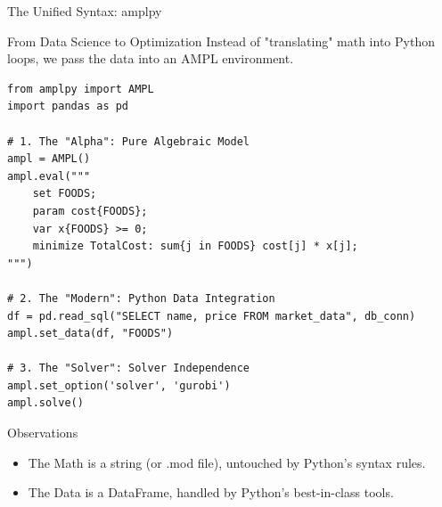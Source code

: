 \documentclass[presentation, aspectratio=169]{beamer}
\begin{document}
\begin{frame}[label={sec:org57c4a86},fragile]{The Unified Syntax: amplpy}
\begin{block}{From Data Science to Optimization}
Instead of "translating" math into Python loops, we pass the data into an AMPL environment.

\scriptsize
\begin{verbatim}
from amplpy import AMPL
import pandas as pd

# 1. The "Alpha": Pure Algebraic Model
ampl = AMPL()
ampl.eval("""
    set FOODS;
    param cost{FOODS};
    var x{FOODS} >= 0;
    minimize TotalCost: sum{j in FOODS} cost[j] * x[j];
""")

# 2. The "Modern": Python Data Integration
df = pd.read_sql("SELECT name, price FROM market_data", db_conn)
ampl.set_data(df, "FOODS")

# 3. The "Solver": Solver Independence
ampl.set_option('solver', 'gurobi')
ampl.solve()
\end{verbatim}
\end{block}

\begin{block}{Observations}
\begin{itemize}
\item The \alert{\alert{Math}} is a string (or .mod file), untouched by Python's syntax rules.
\item The \alert{\alert{Data}} is a DataFrame, handled by Python's best-in-class tools.
\end{itemize}
\end{block}
\end{frame}
\end{document}
